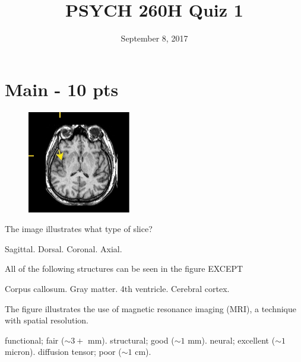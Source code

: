 \documentclass[]{exam}
\title{PSYCH 260H Quiz 1}
\author{}
\date{September 8, 2017}
\begin{document}
\maketitle

\begin{center}
\end{center}
\vspace{0.1in}

\newpage

\section{Main - 10 pts}

\begin{questions}


\begin{figure}[h]
\includegraphics[width=0.4\textwidth]{img/260-2016-09-12-quiz-1-fig-1.jpg}
\centering
\end{figure}

\question The image illustrates what type of slice?
\begin{choices}
\choice Sagittal.
\choice Dorsal.
\choice Coronal.
\correctchoice Axial.
\end{choices}

\question All of the following structures can be seen in the figure EXCEPT
\begin{choices}
\choice Corpus callosum.
\choice Gray matter.
\correctchoice 4th ventricle.
\choice Cerebral cortex.
\end{choices}

\question The figure illustrates the use of \fillin magnetic resonance imaging (MRI), a technique with \fillin spatial resolution.
\begin{choices}
\choice functional; fair ($\sim 3+$ mm).
\correctchoice structural; good ($\sim 1$ mm).
\choice neural; excellent ($\sim 1$ micron).
\choice diffusion tensor; poor ($\sim 1$ cm).
\end{choices}


\end{questions}
\end{document}
